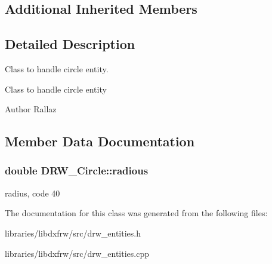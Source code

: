 \subsection*{Additional Inherited Members}


\subsection{Detailed Description}
Class to handle circle entity. 

Class to handle circle entity \begin{DoxyAuthor}{Author}
Rallaz 
\end{DoxyAuthor}


\subsection{Member Data Documentation}
\hypertarget{classDRW__Circle_ab431594544fbe949dd44cbb79e1a7237}{
\subsubsection[{radious}]{\setlength{\rightskip}{0pt plus 5cm}double D\-R\-W\-\_\-\-Circle\-::radious}}\label{classDRW__Circle_ab431594544fbe949dd44cbb79e1a7237}
radius, code 40 

The documentation for this class was generated from the following files\-:\begin{DoxyCompactItemize}
\item 
libraries/libdxfrw/src/drw\-\_\-entities.\-h\item 
libraries/libdxfrw/src/drw\-\_\-entities.\-cpp\end{DoxyCompactItemize}
